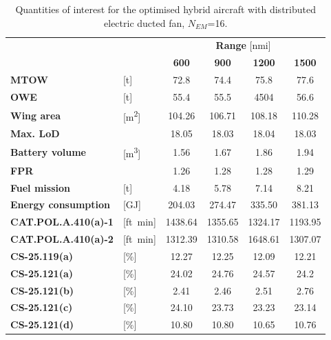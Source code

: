 \begin{table}[!h]
	\centering
	\begin{tabular}{l l c c c c}
		\cline{3-6}
		& & \multicolumn{4}{c}{\textbf{Range} [nmi]} \\
		& & \textbf{600} & \textbf{900} & \textbf{1200} & \textbf{1500} \\
		\hline
		\textbf{MTOW} & [\si{\tonne}] & 72.8 & 74.4 & 75.8 & 77.6 \\
		\textbf{OWE} & [\si{\tonne}] & 55.4 & 55.5 & 4504 & 56.6 \\
		\textbf{Wing area} & [\si{\square\meter}] & 104.26 & 106.71 & 108.18 & 110.28 \\
		\textbf{Max. LoD} & & 18.05 & 18.03 & 18.04 & 18.03  \\
		\textbf{Battery volume} & [\si{\cubic\meter}] & 1.56 & 1.67 & 1.86 & 1.94 \\
		\textbf{FPR} & & 1.26 & 1.28 & 1.28 & 1.29 \\
		\textbf{Fuel mission} & [\si{\tonne}] & 4.18 & 5.78  & 7.14 & 8.21 \\
		\textbf{Energy consumption} & [\si{\giga\joule}] & 204.03 & 274.47 & 335.50 & 381.13 \\
		\hline
		\textbf{CAT.POL.A.410(a)-1} & [ft\si{\per\minute}] & 1438.64 & 1355.65 & 1324.17 & 1193.95  \\
		\textbf{CAT.POL.A.410(a)-2} & [ft\si{\per\minute}] & 1312.39 & 1310.58 & 1648.61 & 1307.07 \\
		\textbf{CS-25.119(a)} & [\%] & 12.27 & 12.25 & 12.09 & 12.21 \\
		\textbf{CS-25.121(a)} & [\%] & 24.02 & 24.76 & 24.57 & 24.2 \\
		\textbf{CS-25.121(b)} & [\%] & 2.41 & 2.46 & 2.51 & 2.76\\
		\textbf{CS-25.121(c)} & [\%] & 24.10 & 23.73 & 23.23 & 23.14 \\
		\textbf{CS-25.121(d)} & [\%] & 10.80 & 10.80 & 10.65 & 10.76 \\
		\hline
	\end{tabular}
	\caption{Quantities of interest for the optimised hybrid aircraft with distributed electric ducted fan, $N_{EM}$=16.}
	\label{tab:hybrid_dep_optim_res_n16}
\end{table}

